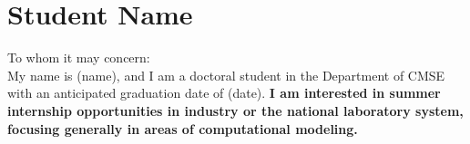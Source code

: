 




\noindent {}


\vspace{2em}



\section{Student Name}
\label{sec:student_name}

\setlength\parindent{0cm}

To whom it may concern:\\

My name is (name), and I am a doctoral student in the Department of CMSE with an anticipated graduation date of (date). {\textbf{I am interested in summer internship opportunities in industry or the national laboratory system, focusing generally in areas of computational modeling.}}\\

